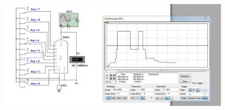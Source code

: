 \documentclass[spec, och, labwork]{shiza}
\begin{document}
\begin{figure}[H]
    \centering
    \includegraphics[width=6.49167in,height=3.06667in]{image2.jpeg}
\end{figure}
\end{document}
